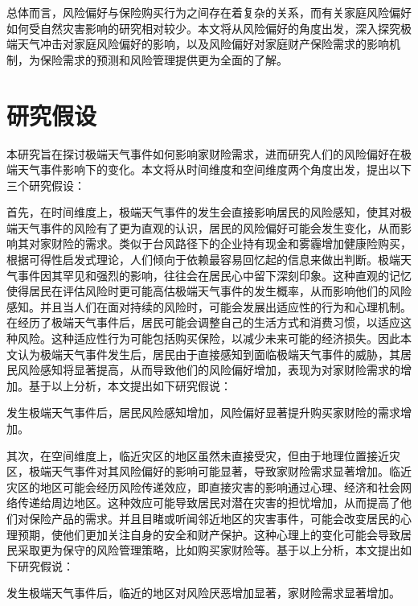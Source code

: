 总体而言，风险偏好与保险购买行为之间存在着复杂的关系，而有关家庭风险偏好如何受自然灾害影响的研究相对较少。本文将从风险偏好的角度出发，深入探究极端天气冲击对家庭风险偏好的影响，以及风险偏好对家庭财产保险需求的影响机制，为保险需求的预测和风险管理提供更为全面的了解。

\section{研究假设}

本研究旨在探讨极端天气事件如何影响家财险需求，进而研究人们的风险偏好在极端天气事件影响下的变化。本文将从时间维度和空间维度两个角度出发，提出以下三个研究假设：

首先，在时间维度上，极端天气事件的发生会直接影响居民的风险感知，使其对极端天气事件的风险有了更为直观的认识，居民的风险偏好可能会发生变化，从而影响其对家财险的需求。类似于台风路径下的企业持有现金\citep{0Do}和雾霾增加健康险购买\citep{赵强2021空气污染对商业健康保险需求的影响}，根据可得性启发式理论\citep{tversky1973availability}，人们倾向于依赖最容易回忆起的信息来做出判断。极端天气事件因其罕见和强烈的影响，往往会在居民心中留下深刻印象。这种直观的记忆使得居民在评估风险时更可能高估极端天气事件的发生概率，从而影响他们的风险感知。并且当人们在面对持续的风险时，可能会发展出适应性的行为和心理机制\citep{gigerenzer2011heuristic}。在经历了极端天气事件后，居民可能会调整自己的生活方式和消费习惯，以适应这种风险。这种适应性行为可能包括购买保险，以减少未来可能的经济损失。因此本文认为极端天气事件发生后，居民由于直接感知到面临极端天气事件的威胁，其居民风险感知将显著提高，从而导致他们的风险偏好增加，表现为对家财险需求的增加。基于以上分析，本文提出如下研究假说：

\begin{hyp} \label{hyp:1}
    发生极端天气事件后，居民风险感知增加，风险偏好显著提升购买家财险的需求增加。
\end{hyp}

其次，在空间维度上，临近灾区的地区虽然未直接受灾，但由于地理位置接近灾区，极端天气事件对其风险偏好的影响可能显著\citep{0Do}，导致家财险需求显著增加。临近灾区的地区可能会经历风险传递效应，即直接灾害的影响通过心理、经济和社会网络传递给周边地区。这种效应可能导致居民对潜在灾害的担忧增加，从而提高了他们对保险产品的需求。并且目睹或听闻邻近地区的灾害事件，可能会改变居民的心理预期，使他们更加关注自身的安全和财产保护。这种心理上的变化可能会导致居民采取更为保守的风险管理策略，比如购买家财险等。基于以上分析，本文提出如下研究假说：

\begin{hyp} \label{hyp:3}
    发生极端天气事件后，临近的地区对风险厌恶增加显著，家财险需求显著增加。
\end{hyp}

